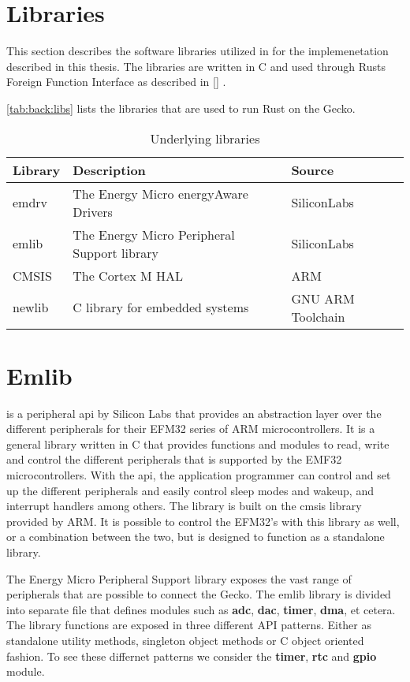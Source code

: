 
\section{Libraries}
\label{sec:back:lib}

This section describes the software libraries utilized in for the implemenetation described in this thesis.
The libraries are written in C and used through Rusts Foreign Function Interface as described in \autoref{} .

\autoref{tab:back:libs} lists the libraries that are used to run Rust on the Gecko.

\begin{table}[H]
  \begin{tabular}{|l|l|l|}
    \hline
    Library & Description & Source \\
    \hline
    \hline
    emdrv & The Energy Micro energyAware Drivers & SiliconLabs \\
    emlib & The Energy Micro Peripheral Support library & SiliconLabs \\
    CMSIS & The Cortex M HAL & ARM \\
    newlib & C library for embedded systems & GNU ARM Toolchain \\
    \hline
  \end{tabular}
  \caption{Underlying libraries}
  \label{tab:back:libs}
\end{table}

\section{Emlib}
\label{sub:emlib}

\emlib is a peripheral \gls{api} by Silicon Labs that provides an abstraction layer over the different peripherals for their EFM32 series of ARM microcontrollers.
It is a general library written in C that provides functions and modules to read, write and control the different peripherals that is supported by the EMF32 microcontrollers.
With the \gls{api}, the application programmer can control and set up the different peripherals and easily control sleep modes and wakeup, and interrupt handlers among others.
The library is built on the \gls{cmsis} library provided by ARM.
It is possible to control the EFM32's with this library as well, or a combination between the two, but \emlib is designed to function as a standalone library.


The Energy Micro Peripheral Support library exposes the vast range of peripherals that are possible to connect the Gecko.
The emlib library is divided into separate file that defines modules such as \textbf{adc}, \textbf{dac}, \textbf{timer}, \textbf{dma}, et cetera.
The library functions are exposed in three different API patterns.
Either as standalone utility methods, singleton object methods or C object oriented fashion.
To see these differnet patterns we consider the \textbf{timer}, \textbf{rtc} and \textbf{gpio} module.

